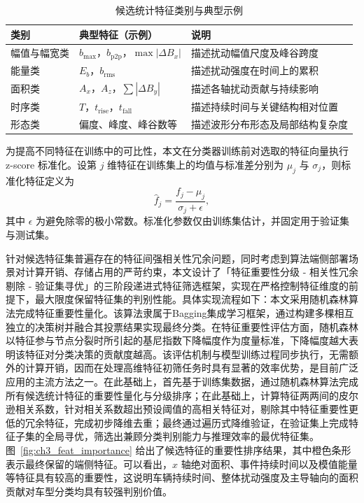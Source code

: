 \documentclass{xdupgthesis}
\begin{document}
\begin{table}[!htbp]
\centering
\small
\caption{候选统计特征类别与典型示例}
\label{tab:ch3_feat_pool}
\setlength{\tabcolsep}{5pt}
\renewcommand{\arraystretch}{1.15}
\begin{tabular}{p{2.6cm} p{4.8cm} p{6.0cm}}
\hline
类别 & 典型特征（示例） & 说明 \\
\hline
幅值与幅宽类 & $b_{\max}$，$b_{\mathrm{p2p}}$，$\max|\Delta B_x|$ & 描述扰动幅值尺度及峰谷跨度 \\
能量类 & $E_b$，$b_{\mathrm{rms}}$ & 描述扰动强度在时间上的累积 \\
面积类 & $A_x$，$A_z$，$\sum |\Delta B_y|$ & 描述各轴扰动贡献与持续影响 \\
时序类 & $T$，$t_{\mathrm{rise}}$，$t_{\mathrm{fall}}$ & 描述持续时间与关键结构相对位置 \\
形态类 & 偏度、峰度、峰谷数等 & 描述波形分布形态及局部结构复杂度 \\
\hline
\end{tabular}
\end{table}

为提高不同特征在训练中的可比性，本文在分类器训练前对选取的特征向量执行 z-score 标准化。设第 $j$ 维特征在训练集上的均值与标准差分别为 $\mu_j$ 与 $\sigma_j$，则标准化特征定义为
\begin{equation}
    \hat f_j = \frac{f_j-\mu_j}{\sigma_j+\epsilon},
\end{equation}
其中 $\epsilon$ 为避免除零的极小常数。标准化参数仅由训练集估计，并固定用于验证集与测试集。

针对候选特征集普遍存在的特征间强相关性冗余问题，同时考虑到算法端侧部署场景对计算开销、存储占用的严苛约束，本文设计了「特征重要性分级 - 相关性冗余剔除 - 验证集寻优」的三阶段递进式特征筛选框架，实现在严格控制特征维度的前提下，最大限度保留特征集的判别性能。具体实现流程如下：本文采用随机森林算法完成特征重要性量化。该算法隶属于Bagging集成学习框架，通过构建多棵相互独立的决策树并融合其投票结果实现最终分类。在特征重要性评估方面，随机森林以特征参与节点分裂时所引起的基尼指数下降幅度作为度量标准，下降幅度越大表明该特征对分类决策的贡献度越高。该评估机制与模型训练过程同步执行，无需额外的计算开销，因而在处理高维特征初筛任务时具有显著的效率优势，是目前广泛应用的主流方法之一。在此基础上，首先基于训练集数据，通过随机森林算法完成所有候选统计特征的重要性量化与分级排序；在此基础上，计算特征两两间的皮尔逊相关系数，针对相关系数超出预设阈值的高相关特征对，剔除其中特征重要性更低的冗余特征，完成初步降维去重；最终通过遍历式降维验证，在验证集上完成特征子集的全局寻优，筛选出兼顾分类判别能力与推理效率的最优特征集。图~\ref{fig:ch3_feat_importance} 给出了候选特征的重要性排序结果，其中橙色条形表示最终保留的端侧特征。可以看出，$x$ 轴绝对面积、事件持续时间以及模值能量等特征具有较高的重要性，这说明车辆持续时间、整体扰动强度及主导轴向的面积贡献对车型分类均具有较强判别价值。
\end{document}
